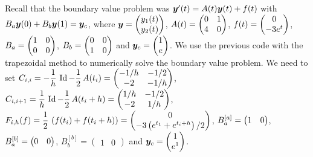 \begin{egg}
Recall that the boundary value problem was
$\bm{y}'(t) = A(t) \bm{y}(t) + f(t)$ with
$B_a \bm{y}(0) + B_b\bm{y}(1) = \bm{y}_c$, where
$\displaystyle \bm{y} = \begin{pmatrix} y_1(t) \\ y_2(t) \end{pmatrix}$,
$\displaystyle A(t) = \begin{pmatrix} 0 & 1 \\ 4 & 0 \end{pmatrix}$,
$\displaystyle f(t) = \begin{pmatrix} 0 \\ -3 e^t \end{pmatrix}$,
$\displaystyle B_a = \begin{pmatrix} 1 & 0 \\  0 & 0 \end{pmatrix}$,
$\displaystyle B_b = \begin{pmatrix} 0 & 0 \\ 1 & 0 \end{pmatrix}$
and $\displaystyle \bm{y}_c = \begin{pmatrix} 1 \\ e \end{pmatrix}$.
We use the previous code with the trapezoidal method to numerically
solve the boundary value problem.  We need to set
$\displaystyle C_{i,i} =  -\frac{1}{h}\,\operatorname{Id} -\frac{1}{2}\,A(t_i)
= \begin{pmatrix} -1/h & -1/2 \\ -2 & -1/h \end{pmatrix}$,
$\displaystyle C_{i,i+1} = \frac{1}{h}\,\operatorname{Id} -\frac{1}{2}\,A(t_i+h)
= \begin{pmatrix} 1/h & -1/2 \\ -2 & 1/h \end{pmatrix}$,
$\displaystyle F_{i,h}(f) = \frac{1}{2}\,\left( f(t_i) + f(t_i+h) \right)
= \begin{pmatrix} 0 \\ -3 \left(e^{t_1} + e^{t_i+h}\right)/2 \end{pmatrix}$,
$\displaystyle B_a^{[a]} = \begin{pmatrix} 1 & 0 \end{pmatrix}$,
$\displaystyle B_a^{[b]} = \begin{pmatrix} 0 & 0 \end{pmatrix}$,
$B_b^{[b]} = \begin{pmatrix} 1 & 0 \end{pmatrix}$
and
$\displaystyle \bm{y}_c = \begin{pmatrix} 1 \\ e^1 \end{pmatrix}$.

\end{egg}
